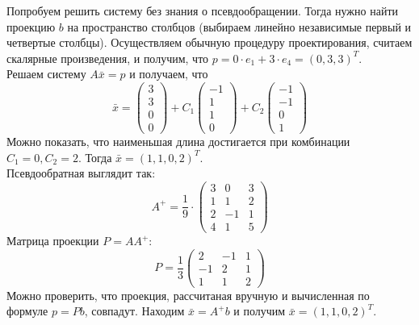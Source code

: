 \documentclass[a4paper,12pt]{article}
\begin{document}
Попробуем решить систему без знания о псевдообращении. Тогда нужно найти проекцию $b$ на пространство столбцов (выбираем линейно независимые первый и четвертые столбцы). Осуществляем обычную процедуру проектирования, считаем скалярные произведения, и получим, что $p = 0 \cdot e_1 + 3 \cdot e_4 = (0, 3, 3)^T$. \\
Решаем систему $A\bar{x} = p$ и получаем, что
\[\bar{x} = \begin{pmatrix} 3 \\ 3 \\ 0 \\ 0 \end{pmatrix} + C_1 
\begin{pmatrix} -1 \\ 1 \\ 1 \\ 0 \end{pmatrix} + C_2 \begin{pmatrix} -1 \\ -1 \\ 0 \\ 1 \end{pmatrix}\]
Можно показать, что наименьшая длина достигается при комбинации $C_1 = 0, C_2 = 2$. Тогда $\bar{x} = (1, 1, 0, 2)^T.$  \\
Псевдообратная выглядит так:
\[ A^+ = \frac{1}{9} \cdot \begin{pmatrix} 
3 & 0 & 3 \\
1 & 1 & 2  \\
2 & -1 & 1  \\
4 & 1 & 5
\end{pmatrix} \]
Матрица проекции $P = AA^+$:
\[ P = \frac{1}{3}\begin{pmatrix} 
2 & -1 & 1 \\
-1 & 2 & 1 \\
1 & 1 & 2 
\end{pmatrix} \]
Можно проверить, что проекция, рассчитаная вручную и вычисленная по формуле $p = Pb$, совпадут. Находим $\bar{x} = A^+b$ и получим $\bar{x} = (1, 1, 0, 2)^T$.
\end{document}
